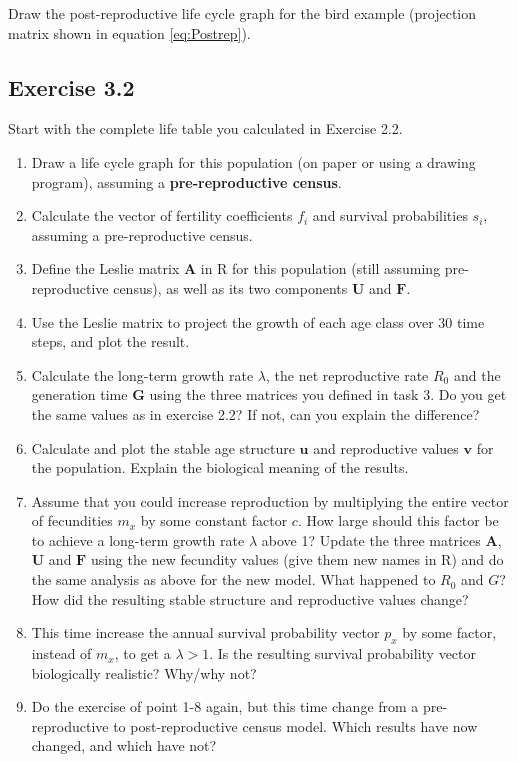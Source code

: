 \documentclass[
]{book}
\begin{document}
Draw the post-reproductive life cycle graph for the bird example (projection matrix shown in equation \eqref{eq:Postrep}).

\hypertarget{exercise-3.2}{%
\subsection*{Exercise 3.2}\label{exercise-3.2}}

Start with the complete life table you calculated in Exercise 2.2.

\begin{enumerate}
\def\labelenumi{\arabic{enumi}.}
\item
  Draw a life cycle graph for this population (on paper or using a drawing program), assuming a \textbf{pre-reproductive census}.
\item
  Calculate the vector of fertility coefficients \(f_i\) and survival probabilities \(s_i\), assuming a pre-reproductive census.
\item
  Define the Leslie matrix \(\mathbf{A}\) in R for this population (still assuming pre-reproductive census), as well as its two components \(\mathbf{U}\) and \(\mathbf{F}\).
\item
  Use the Leslie matrix to project the growth of each age class over 30 time steps, and plot the result.
\item
  Calculate the long-term growth rate \(\lambda\), the net reproductive rate \(R_0\) and the generation time \(\mathbf{G}\) using the three matrices you defined in task 3. Do you get the same values as in exercise 2.2? If not, can you explain the difference?
\item
  Calculate and plot the stable age structure \(\mathbf{u}\) and reproductive values \(\mathbf{v}\) for the population. Explain the biological meaning of the results.
\item
  Assume that you could increase reproduction by multiplying the entire vector of fecundities \(m_x\) by some constant factor \(c\). How large should this factor be to achieve a long-term growth rate \(\lambda\) above 1? Update the three matrices \(\mathbf{A}\), \(\mathbf{U}\) and \(\mathbf{F}\) using the new fecundity values (give them new names in R) and do the same analysis as above for the new model. What happened to \(R_0\) and \(G\)? How did the resulting stable structure and reproductive values change?
\item
  This time increase the annual survival probability vector \(p_x\) by some factor, instead of \(m_x\), to get a \(\lambda>1\). Is the resulting survival probability vector biologically realistic? Why/why not?
\item
  Do the exercise of point 1-8 again, but this time change from a pre-reproductive to post-reproductive census model. Which results have now changed, and which have not?
\end{enumerate}
\end{document}
